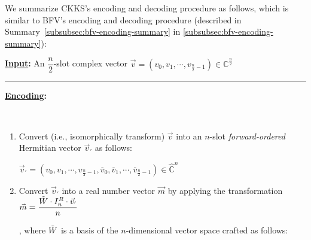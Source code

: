 We summarize CKKS's encoding and decoding procedure as follows, which is similar to BFV's encoding and decoding procedure (described in Summary~\ref*{subsubsec:bfv-encoding-summary} in \autoref{subsubsec:bfv-encoding-summary}):

\begin{tcolorbox}[title={\textbf{\tboxlabel{\ref*{subsec:ckks-encoding-decoding}} CKKS's Encoding and Decoding}}]

\textbf{\underline{Input}:} An $\dfrac{n}{2}$-slot complex vector $\vec{v} = (v_0, v_1, \cdots, v_{\frac{n}{2}-1}) \in \mathbb{C}^{\frac{n}{2}}$

\par\noindent\rule{\textwidth}{0.4pt}

\textbf{\underline{Encoding}:}

$ $

\begin{enumerate}
\item Convert (i.e., isomorphically transform) $\vec{v}$ into an $n$-slot \textit{forward-ordered} Hermitian vector $\vec{v}_{'}$ as follows:

$\vec{v}_{'} = (v_0, v_1, \cdots, v_{\frac{n}{2}-1}, \overline v_0, \overline v_1, \cdots, \overline v_{\frac{n}{2}-1}) \in \mathbb{\hat C}^{n}$

\item Convert $\vec{v}_{'}$ into a real number vector $\vec{m}$ by applying the transformation $\vec{m} = \dfrac{\tilde W \cdot I_n^R \cdot \vec{v}_{'}}{n}$

, where $\tilde{W}$ is a basis of the $n$-dimensional vector space crafted as follows:

$ $



\end{enumerate}
\end{tcolorbox}
